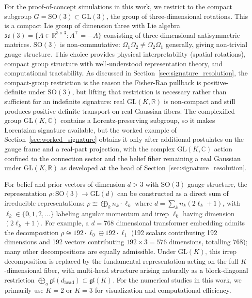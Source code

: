 \documentclass[11pt]{article}
\begin{document}
For the proof-of-concept simulations in this work, we restrict to the compact subgroup $G = \mathrm{SO}(3) \subset \mathrm{GL}(3)$, the group of three-dimensional rotations. This is a compact Lie group of dimension three with Lie algebra $\mathfrak{so}(3) = \{A \in \mathbb{R}^{3 \times 3} : A^\top = -A\}$ consisting of three-dimensional antisymmetric matrices. $\mathrm{SO}(3)$ is non-commutative: $\Omega_1 \Omega_2 \neq \Omega_2 \Omega_1$ generally, giving non-trivial gauge structure. This choice provides physical interpretability (spatial rotations), compact group structure with well-understood representation theory, and computational tractability. As discussed in Section~\ref{sec:signature_resolution}, the compact-group restriction is the reason the Fisher-Rao pullback is positive-definite under $\mathrm{SO}(3)$, but lifting that restriction is necessary rather than sufficient for an indefinite signature: real $\mathrm{GL}(K, \mathbb{R})$ is non-compact and still produces positive-definite transport on real Gaussian fibers. The complexified group $\mathrm{GL}(K, \mathbb{C})$ contains a Lorentz-preserving subgroup, so it makes Lorentzian signature available, but the worked example of Section~\ref{sec:worked_signature} obtains it only after additional postulates on the gauge frame and a real-part projection, with the complex $\mathrm{GL}(K, \mathbb{C})$ action confined to the connection sector and the belief fiber remaining a real Gaussian under $\mathrm{GL}(K, \mathbb{R})$ as developed at the head of Section~\ref{sec:signature_resolution}.

For belief and prior vectors of dimension $d > 3$ with $\mathrm{SO}(3)$ gauge structure, the representation $\rho: \mathrm{SO}(3) \to \mathrm{GL}(d)$ can be constructed as a direct sum of irreducible representations: $\rho \cong \bigoplus_{k} n_k \cdot \ell_k$ where $d = \sum_{k} n_k(2\ell_k + 1)$, with $\ell_k \in \{0,1,2,\ldots\}$ labeling angular momentum and irrep $\ell_k$ having dimension $(2\ell_k + 1)$. For example, a $d=768$ dimensional transformer embedding admits the decomposition $\rho \cong 192 \cdot \ell_0 \oplus 192 \cdot \ell_1$ (192 scalars contributing 192 dimensions and 192 vectors contributing $192 \times 3 = 576$ dimensions, totalling 768); many other decompositions are equally admissible. Under $\mathrm{GL}(K)$, this irrep decomposition is replaced by the fundamental representation acting on the full $K$-dimensional fiber, with multi-head structure arising naturally as a block-diagonal restriction $\bigoplus_a \mathfrak{gl}(d_{\mathrm{head}}) \subset \mathfrak{gl}(K)$. For the numerical studies in this work, we primarily use $K=2$ or $K=3$ for visualization and computational efficiency.
\end{document}
